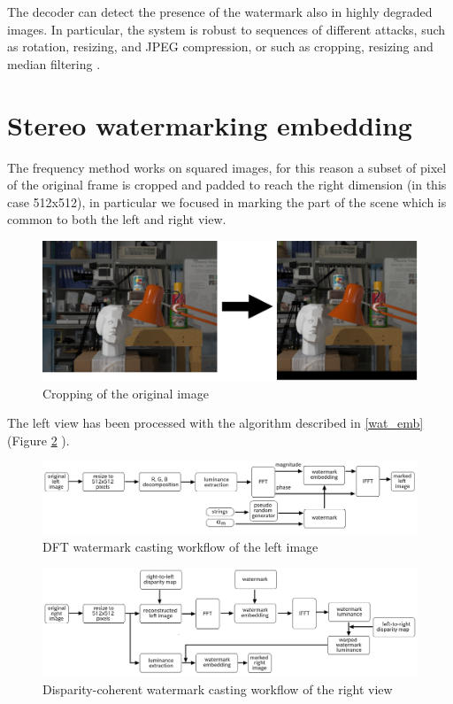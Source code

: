 The decoder can detect the presence of the watermark also in highly degraded images. In particular, the system is robust to sequences of different attacks, such as rotation, resizing, and JPEG compression, or such as cropping, resizing and median filtering \cite{PIVA}.

\section{Stereo watermarking embedding}

The frequency method works on squared images, for this reason a subset of pixel of the original frame is cropped and padded to reach the right dimension (in this case 512x512), in particular we focused in marking the part of the scene which is common to both the left and right view.

\begin{figure}[h!]
\centering
\includegraphics[width=1\textwidth]{./img/cropping.png}
\caption{\small{Cropping of the original image}}
\label{fig:cropped}
\end{figure}

The left view has been processed with the algorithm described in \ref{wat_emb} (Figure \ref{fig:left_wat} ).\newline 


\begin{figure}[h!]
\centering
\includegraphics[width=1\textwidth]{./img/left_wat.png}
\caption{\small{DFT watermark casting workflow of the left image}\label{fig:left_wat}}

\end{figure}


\begin{figure}[h!]
\centering
\includegraphics[width=1\textwidth]{./img/pros.png}
\caption{\small{Disparity-coherent watermark casting workflow of the right view}}
\label{fig:right_wat}
\end{figure}


